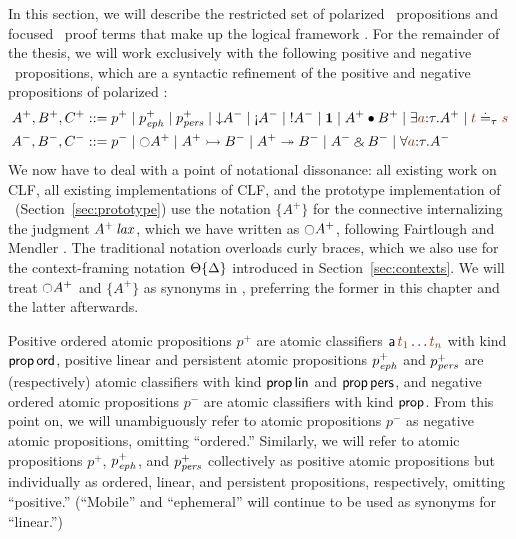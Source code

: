 In this section, we will describe the restricted set of polarized
\ollll~propositions and focused \ollll~proof terms that make up the
logical framework \sls. For the remainder of the thesis, we will work
exclusively with the following positive and negative
\sls~propositions, which are a syntactic refinement of the positive
and negative propositions of polarized \ollll:
\begin{align*}
A^+, B^+, C^+ & ::= p^+ \mid p^+_\meph \mid p^+_\mpers \mid {\downarrow}A^-
  \mid {\gnab}A^- \mid {!}A^- \mid \one \mid A^+ \fuse B^+
  \mid \exists \lf{a}{:}\tau.A^+ \mid \lf{t} \doteq_\tau \lf{s}
\\
A^-, B^-, C^- & ::= p^- \mid {\ocircle}A^+ \mid A^+ \lefti B^- 
  \mid A^+ \righti B^- \mid A^- \with B^-
  \mid \forall \lf{a}{:}\tau.A^-
\end{align*}
We now have to deal with a point of notational dissonance: all
existing work on CLF, all existing implementations of CLF, and the
prototype implementation of \sls~(Section~\ref{sec:prototype}) use the
notation $\{ A^+ \}$ for the connective internalizing the judgment
${A^+}\,{{\it lax}}$, which we have written as ${\ocircle}A^+$, following
Fairtlough and Mendler \cite{fairtlough95propositional}. The
traditional notation overloads curly braces, which we also use for
the context-framing notation 
${\Theta}\{{\Delta}\}$ introduced in Section~\ref{sec:contexts}. We
will treat ${\ocircle}A^+$ and $\{ A^+ \}$ as synonyms in \sls, preferring the
former in this chapter and the latter afterwards.

Positive ordered atomic propositions $p^+$ are atomic classifiers
${\sf a}\,\lf{t_1}\ldots\lf{t_n}$ with kind ${\sf prop}\,{\sf ord}$,
positive linear and persistent atomic propositions $p^+_{\it eph}$ and
$p^+_{\it pers}$ are (respectively) atomic classifiers with kind ${\sf
  prop}\,{\sf lin}$ and ${\sf prop}\,{\sf pers}$, and negative ordered
atomic propositions $p^-$ are atomic classifiers with kind ${\sf
  prop}$.  From this point on, we will unambiguously refer to atomic
propositions $p^-$ as negative atomic propositions, omitting
``ordered.'' Similarly, we will refer to atomic propositions $p^+$,
$p^+_{\it eph}$, and $p^+_{\it pers}$ collectively as positive atomic
propositions but individually as ordered, linear, and persistent
propositions, respectively, omitting ``positive.''  (``Mobile'' and
``ephemeral'' will continue to be used as synonyms for ``linear.'')


